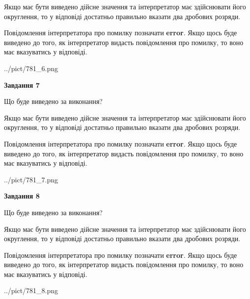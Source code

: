 \documentclass[12pt, ukrainian]{article}
\begin{document}
{\begin {Large}
Якщо має бути виведено дійсне значення та інтерпретатор має здійснювати його округлення, 
то у відповіді достатньо правильно вказати два дробових розряди.

Повідомлення інтерпретатора про помилку позначати \textbf{error}.
Якщо щось буде виведено до того, як інтерпретатор видасть повідомлення про помилку, 
то воно має вказуватись у відповіді. \par

\begin{center}
	{../pict/781_6.png}
\end{center}
\newpage

{\begin {center}\textbf{Завдання 7}\end {center}}\par
Що буде виведено за виконання? \par

Якщо має бути виведено дійсне значення та інтерпретатор має здійснювати його округлення, 
то у відповіді достатньо правильно вказати два дробових розряди.

Повідомлення інтерпретатора про помилку позначати \textbf{error}.
Якщо щось буде виведено до того, як інтерпретатор видасть повідомлення про помилку, 
то воно має вказуватись у відповіді. \par

\begin{center}
	{../pict/781_7.png}
\end{center}
\newpage

{\begin {center}\textbf{Завдання 8}\end {center}}\par
Що буде виведено за виконання? \par

Якщо має бути виведено дійсне значення та інтерпретатор має здійснювати його округлення, 
то у відповіді достатньо правильно вказати два дробових розряди.

Повідомлення інтерпретатора про помилку позначати \textbf{error}.
Якщо щось буде виведено до того, як інтерпретатор видасть повідомлення про помилку, 
то воно має вказуватись у відповіді. \par

\begin{center}
	{../pict/781_8.png}
\end{center}
\newpage


\end{Large}}
\end{document}
